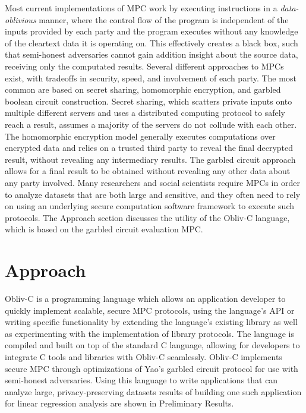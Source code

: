 \documentclass[conference]{IEEEtran}
\begin{document}
Most current implementations of MPC work by executing instructions in a \emph{data-oblivious} manner, where the control flow of the program is independent of the 
inputs provided by each party and the program executes without any 
knowledge of the cleartext data it is operating on.
This effectively creates a black box, such that semi-honest adversaries 
cannot gain addition insight about the source data, receiving only the computated results.
Several different approaches to MPCs exist, with tradeoffs in security, speed, and
involvement of each party. The most common are based on secret sharing, homomorphic
encryption, and garbled boolean circuit construction. Secret sharing, which
scatters private inputs onto multiple different servers and uses a distributed computing
protocol to safely reach a result, assumes a majority of the servers do not collude
with each other. The homomorphic encryption model generally executes computations over
encrypted data and relies on a trusted third party to reveal the final decrypted result,
without revealing any intermediary results. The garbled circuit approach allows for
a final result to be obtained without revealing any other data about any party involved.
Many researchers and social scientists require MPCs in order to analyze datasets that are 
both large and sensitive, and they often need to rely on using an underlying 
secure computation software framework to execute such protocols.
The Approach section discusses the utility of the Obliv-C language, which is based on 
the garbled circuit evaluation MPC.

\section{Approach}

Obliv-C is a programming language which allows an application developer to
quickly implement scalable, secure MPC protocols, using the language’s 
API or writing specific functionality by extending the language's existing library as
well as experimenting with the implementation of library 
protocols\cite{cryptoeprint:2015:1153}. The language is compiled and built 
on top of the standard C language, allowing for developers to 
integrate C tools and libraries with Obliv-C seamlessly.
Obliv-C implements secure MPC through optimizations of Yao's garbled circuit protocol 
for use with semi-honest adversaries. Using this language to write applications 
that can analyze large, privacy-preserving datasets 
results of building one such application for linear regression analysis 
are shown in Preliminary Results.
\end{document}
